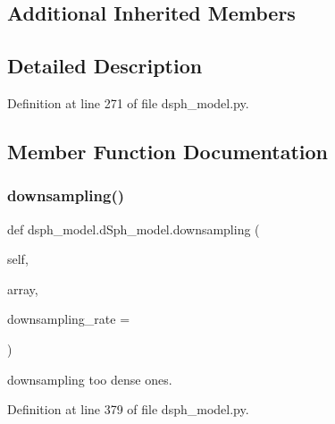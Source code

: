 \subsection*{Additional Inherited Members}


\subsection{Detailed Description}


Definition at line 271 of file dsph\+\_\+model.\+py.



\subsection{Member Function Documentation}
\mbox{\label{classdsph__model_1_1dSph__model_a4d9e1c397b4ae379c680bc7453845781}} 
\subsubsection{\texorpdfstring{downsampling()}{downsampling()}}
{\footnotesize\ttfamily def dsph\+\_\+model.\+d\+Sph\+\_\+model.\+downsampling (\begin{DoxyParamCaption}\item[{}]{self,  }\item[{}]{array,  }\item[{}]{downsampling\+\_\+rate = {} }\end{DoxyParamCaption})}

\begin{DoxyVerb}downsampling too dense ones.
\end{DoxyVerb}
 

Definition at line 379 of file dsph\+\_\+model.\+py.


